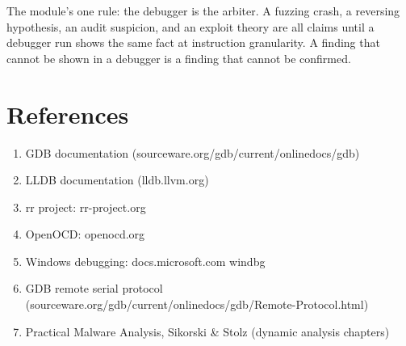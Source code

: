 \documentclass[12pt]{Training}
\begin{document}
The module's one rule: the debugger is the arbiter. A fuzzing crash, a reversing hypothesis, an audit suspicion, and an exploit theory are all claims until a debugger run shows the same fact at instruction granularity. A finding that cannot be shown in a debugger is a finding that cannot be confirmed.

\section*{References}
\begin{enumerate}
	\item GDB documentation (sourceware.org/gdb/current/onlinedocs/gdb)
	\item LLDB documentation (lldb.llvm.org)
	\item rr project: rr-project.org
	\item OpenOCD: openocd.org
	\item Windows debugging: docs.microsoft.com windbg
	\item GDB remote serial protocol (sourceware.org/gdb/current/onlinedocs/gdb/Remote-Protocol.html)
	\item Practical Malware Analysis, Sikorski \& Stolz (dynamic analysis chapters)
\end{enumerate}
\end{document}
